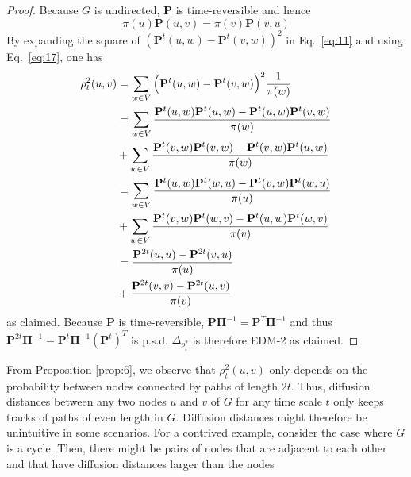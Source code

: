 \documentclass[10pt,twocolumn]{article}
\numberwithin{equation}{section}
\begin{document}
\begin{proof}
  Because $G$ is undirected, $\mathbf{P}$ is time-reversible and hence
  \begin{equation}
    \label{eq:17}
    \pi(u) \mathbf{P}(u,v) = \pi(v) \mathbf{P}(v,u) 
  \end{equation}
  By expanding the square of $(\mathbf{P}^{t}(u,w) -
  \mathbf{P}^{t}(v,w))^{2}$ in Eq.~\eqref{eq:11} and using
  Eq.~\eqref{eq:17}, one has
  \begin{equation*}
    \begin{split}
      \rho_{t}^{2}(u,v) &= \sum_{w \in V}{\Bigl(\mathbf{P}^{t}(u,w) -
        \mathbf{P}^{t}(v,w)\Bigr)^2 \frac{1}{\pi(w)}} \\
      &= \sum_{w \in V}{\frac{\mathbf{P}^{t}(u,w)\mathbf{P}^{t}(u,w) -
          \mathbf{P}^{t}(u,w)\mathbf{P}^{t}(v,w)}{\pi(w)}} \\
      &+\sum_{w \in V}{\frac{\mathbf{P}^{t}(v,w)\mathbf{P}^{t}(v,w) -
          \mathbf{P}^{t}(v,w)\mathbf{P}^{t}(u,w)}{\pi(w)}} \\
      &= \sum_{w \in
        V}{\frac{\mathbf{P}^{t}(u,w)\mathbf{P}^{t}(w,u) -
          \mathbf{P}^{t}(v,w)\mathbf{P}^{t}(w,u)}{\pi(u)}} \\ &+
      \sum_{w \in V}{\frac{\mathbf{P}^{t}(v,w)\mathbf{P}^{t}(w,v)
          -
          \mathbf{P}^{t}(u,w)\mathbf{P}^{t}(w,v)}{\pi(v)}} \\
      &= \frac{\mathbf{P}^{2t}(u,u) -
        \mathbf{P}^{2t}(v,u)}{\pi(u)} \\ &+
      \frac{\mathbf{P}^{2t}(v,v) -
        \mathbf{P}^{2t}(u,v)}{\pi(v)} 
    \end{split} 
  \end{equation*}
  as claimed. Because $\mathbf{P}$ is time-reversible,
  $\mathbf{P}\bm{\Pi}^{-1} = \mathbf{P}^{T}\bm{\Pi}^{-1}$ and thus
  $\mathbf{P}^{2t}\bm{\Pi}^{-1} =
  \mathbf{P}^{t}\bm{\Pi}^{-1}(\mathbf{P}^{t})^{T}$ is
  p.s.d. $\Delta_{\rho_{t}^{2}}$ is therefore EDM-2 as claimed.
\end{proof} 
From Proposition \ref{prop:6}, we observe that $\rho_{t}^{2}(u,v)$
only depends on the probability between nodes connected by paths of
length $2t$. Thus, diffusion distances between any two nodes $u$ and
$v$ of $G$ for any time scale $t$ only keeps tracks of paths of even
length in $G$. Diffusion distances might therefore be unintuitive in
some scenarios. For a contrived example, consider the case where $G$
is a cycle. Then, there might be pairs of nodes that are adjacent to
each other and that have diffusion distances larger than the nodes
\end{document}
